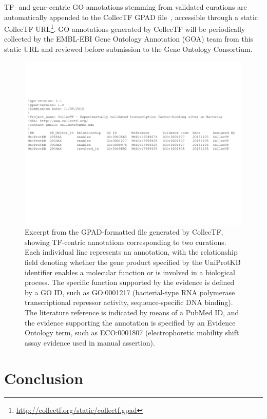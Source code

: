 TF- and gene-centric GO annotations stemming from validated curations are
automatically appended to the CollecTF GPAD file~\citep{gene2013gene},
accessible through a static CollecTF
URL\footnote{\url{http://collectf.org/static/collectf.gpad}}. GO annotations
generated by CollecTF will be periodically collected by the EMBL-EBI Gene
Ontology Annotation (GOA) team from this static URL and reviewed before
submission to the Gene Ontology Consortium.


\begin{figure}
  \centering
  \includegraphics[width=\textwidth]{figures/chapter2/gpad}
  \caption[Excerpt from the GPAD-formatted file generated by CollecTF.]{Excerpt
    from the GPAD-formatted file generated by CollecTF, showing TF-centric
    annotations corresponding to two curations. Each individual line represents
    an annotation, with the relationship field denoting whether the gene
    product specified by the UniProtKB identifier enables a molecular function
    or is involved in a biological process. The specific function supported by
    the evidence is defined by a GO ID, such as GO:0001217 (bacterial-type RNA
    polymerase transcriptional repressor activity, sequence-specific DNA
    binding). The literature reference is indicated by means of a PubMed ID,
    and the evidence supporting the annotation is specified by an Evidence
    Ontology term, such as ECO:0001807 (electrophoretic mobility shift assay
    evidence used in manual assertion).}
\label{fig:gpad}
\end{figure}

\section{Conclusion}

